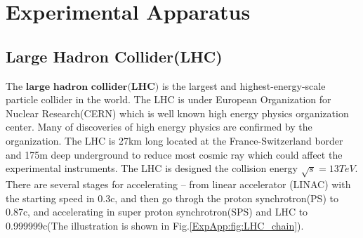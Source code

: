 

\clearpage
\section{Experimental Apparatus}
\label{sec:ExperimentalAppratus}

	\subsection{Large Hadron Collider(LHC)}
	\label{ssec:ExpApp_LHC}

		The $\textbf{large}$ $\textbf{hadron}$ $\textbf{collider}$$\textbf{(LHC)}$ is the largest and highest-energy-scale particle collider in the world. The LHC is under European Organization for Nuclear Research(CERN) which is well known high energy physics organization center. Many of discoveries of high energy physics are confirmed by the organization. The LHC is 27km long located at the France-Switzerland border and 175m deep underground to reduce most cosmic ray which could affect the experimental instruments. The LHC is designed the collision energy $\sqrt{s} = 13TeV$. There are several stages for accelerating -- from linear accelerator (LINAC) with the starting speed in 0.3c, and then go throgh the proton synchrotron(PS) to 0.87c, and accelerating in super proton synchrotron(SPS) and LHC to 0.999999c(The illustration is shown in Fig.\ref{ExpApp:fig:LHC_chain}). 

